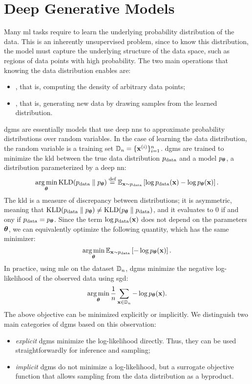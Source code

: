\section{Deep Generative Models}
Many \gls{ml} tasks require to learn the underlying probability distribution of the data. This is an inherently unsupervised problem, since to know this distribution, the model must capture the underlying structure of the data space, such as regions of data points with high probability. The two main operations that knowing the data distribution enables are:
\begin{itemize}
    \item {}, that is, computing the density of arbitrary data points;
    \item {}, that is, generating new data by drawing samples from the learned distribution.
\end{itemize}
\glspl{dgm} \citep{goodfellow2016dl} are essentially models that use deep \glspl{nn} to approximate probability distributions over random variables. In the case of learning the data distribution, the random variable is a training set $\Data_n = \Set{\VPattern{x}{i}}_{i=1}^n$. \glspl{dgm} are trained to minimize the \gls{kld} between the true data distribution $p_{\mathrm{data}}$ and a model $p_{\boldsymbol{\theta}}$, a distribution parameterized by a deep \gls{nn}:
$$\argmin_{\Param} \Fun{KLD}(\PData \;\Vert\; p_{\Param}) \defeq \Expect_{\Vector{x} \sim \PData}\Brack{\log \PData(\Vector{x}) -\log p_{\Param}(\Vector{x})}.$$
The \gls{kld} is a measure of discrepancy between distributions; it is asymmetric, meaning that $\mathrm{KLD}(p_{\mathrm{data}} \;\Vert\; p_{\boldsymbol{\theta}}) \neq \mathrm{KLD}(p_{\boldsymbol{\theta}} \;\Vert\; p_{\mathrm{data}})$, and it evaluates to 0 if and ony if $p_{\mathrm{data}} = p_{\boldsymbol{\theta}}$. Since the term $\log \PData(\Vector{x})$ does not depend on the parameters $\boldsymbol{\theta}$, we can equivalently optimize the following quantity, which has the same minimizer:
$$\argmin_{\Param} \Expect_{\Vector{x} \sim \PData}\Brack{-\log p_{\Param}(\Vector{x})}.$$
In practice, using \gls{mle} on the dataset $\mathbb{D}_n$, \glspl{dgm} minimize the negative log-likelihood of the observed data using \gls{sgd}:
$$\argmin_{\Param} \frac{1}{n} \sum_{\Vector{x} \in \Data_n}-\log p_{\Param}(\Vector{x}).$$
The above objective can be minimized explicitly or implicitly. We distinguish two main categories of \glspl{dgm} based on this observation:
\begin{itemize}
    \item \emph{explicit} \glspl{dgm} minimize the log-likelihood directly. Thus, they can be used straightforwardly for inference and sampling;
    \item \emph{implicit} \glspl{dgm} do not minimize a log-likelihood, but a surrogate objective function that allows sampling from the data distribution as a byproduct.
\end{itemize}
